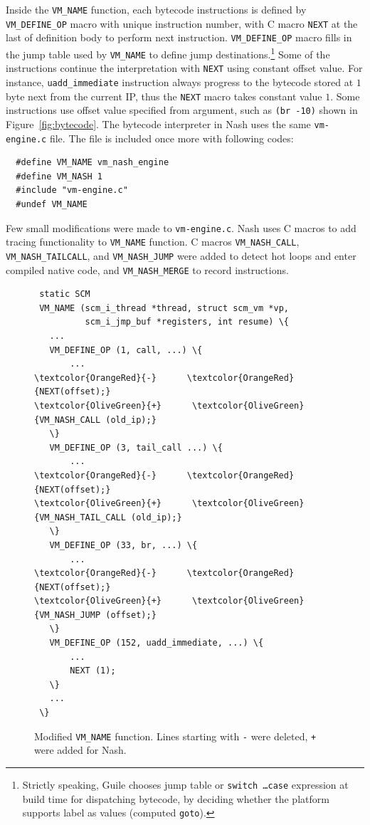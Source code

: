 \documentclass[preprint, 10pt]{sigplanconf}
\begin{document}
Inside the \texttt{VM\_NAME} function, each bytecode instructions is defined
by \texttt{VM\_DEFINE\_OP} macro with unique instruction number, with C macro
\texttt{NEXT} at the last of definition body to perform next
instruction. \texttt{VM\_DEFINE\_OP} macro fills in the jump table used by
\texttt{VM\_NAME} to define jump destinations.\footnote{Strictly speaking,
  Guile chooses jump table or \texttt{switch \ldots\@ case} expression at
  build time for dispatching bytecode, by deciding whether the platform
  supports label as values (computed \texttt{goto}).}  Some of the
instructions continue the interpretation with \texttt{NEXT} using constant
offset value. For instance, \texttt{uadd\_immediate} instruction always
progress to the bytecode stored at $1$ byte next from the current IP, thus the
\texttt{NEXT} macro takes constant value $1$. Some instructions use offset
value specified from argument, such as \texttt{(br -10)} shown in
Figure~\hyperref[fig:bytecode]{\ref{fig:bytecode}}.  The bytecode interpreter
in Nash uses the same \texttt{vm-engine.c} file. The file is included once
more with following codes:

\begin{verbatim}
  #define VM_NAME vm_nash_engine
  #define VM_NASH 1
  #include "vm-engine.c"
  #undef VM_NAME
\end{verbatim}

Few small modifications were made to \texttt{vm-engine.c}. Nash uses C macros
to add tracing functionality to \texttt{VM\_NAME} function. C macros
\texttt{VM\_NASH\_CALL}, \texttt{VM\_NASH\_TAILCALL}, and
\texttt{VM\_NASH\_JUMP} were added to detect hot loops and enter compiled
native code, and \texttt{VM\_NASH\_MERGE} to record instructions.

\begin{figure}
  \centering
  \small
\begin{Verbatim}
 static SCM
 VM_NAME (scm_i_thread *thread, struct scm_vm *vp,
          scm_i_jmp_buf *registers, int resume) \{
   ...
   VM_DEFINE_OP (1, call, ...) \{
       ...
\textcolor{OrangeRed}{-}      \textcolor{OrangeRed}{NEXT(offset);}
\textcolor{OliveGreen}{+}      \textcolor{OliveGreen}{VM_NASH_CALL (old_ip);}
   \}
   VM_DEFINE_OP (3, tail_call ...) \{
       ...
\textcolor{OrangeRed}{-}      \textcolor{OrangeRed}{NEXT(offset);}
\textcolor{OliveGreen}{+}      \textcolor{OliveGreen}{VM_NASH_TAIL_CALL (old_ip);}
   \}
   VM_DEFINE_OP (33, br, ...) \{
       ...
\textcolor{OrangeRed}{-}      \textcolor{OrangeRed}{NEXT(offset);}
\textcolor{OliveGreen}{+}      \textcolor{OliveGreen}{VM_NASH_JUMP (offset);}
   \}
   VM_DEFINE_OP (152, uadd_immediate, ...) \{
       ...
       NEXT (1);
   \}
   ...
 \}
\end{Verbatim}
\caption{Modified \texttt{VM\_NAME} function. Lines starting with \texttt{-}
  were deleted, \texttt{+} were added for Nash.}
\label{fig:vmnamenash}
\end{figure}
\end{document}
